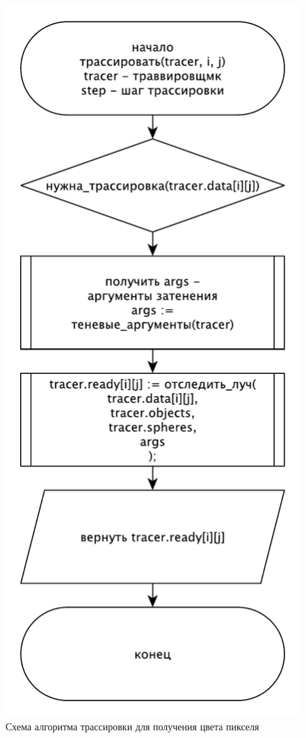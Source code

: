 {    \begin{figure}[H]
    	\centering
    	\includegraphics[height=0.4\textheight]{img/trace2.pdf}
    	\caption{Схема алгоритма трассировки для получения цвета пикселя}
    	\label{fig:trace2}
    \end{figure}
}